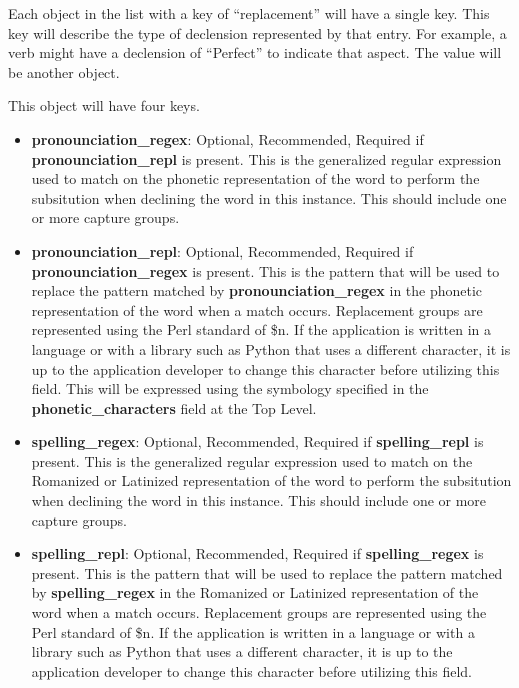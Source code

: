 Each object in the list with a  key of ``replacement'' will have a single key.   This key will describe the type of declension represented by that entry.  For example, a verb might have a declension of ``Perfect'' to indicate that aspect.  The value will be another object.

This object will have four keys.
\begin{itemize}
	\item \textbf{pronounciation\_regex}: Optional, Recommended, Required if \textbf{pronounciation\_repl} is present.  This is the generalized regular expression used to match on the phonetic representation of the word to perform the subsitution when declining the word in this instance.  This should include one or more capture groups.
	\item \textbf{pronounciation\_repl}: Optional, Recommended, Required if \textbf{pronounciation\_regex} is present.  This is the pattern that will be used to replace the pattern matched by \textbf{pronounciation\_regex} in the phonetic representation of the word when a match occurs.  Replacement groups are represented using the Perl standard of \$n.  If the application is written in a language or with a library such as Python that uses a different character, it is up to the application developer to change this character before utilizing this field.  This will be expressed using the symbology specified in the \textbf{phonetic\_characters} field at the Top Level.
	\item \textbf{spelling\_regex}: Optional, Recommended, Required if \textbf{spelling\_repl} is present.  This is the generalized regular expression used to match on the Romanized or Latinized representation of the word to perform the subsitution when declining the word in this instance.  This should include one or more capture groups.
	\item \textbf{spelling\_repl}: Optional, Recommended, Required if \textbf{spelling\_regex} is present.  This is the pattern that will be used to replace the pattern matched by \textbf{spelling\_regex} in the Romanized or Latinized representation of the word when a match occurs.  Replacement groups are represented using the Perl standard of \$n.  If the application is written in a language or with a library such as Python that uses a different character, it is up to the application developer to change this character before utilizing this field.
\end{itemize}

